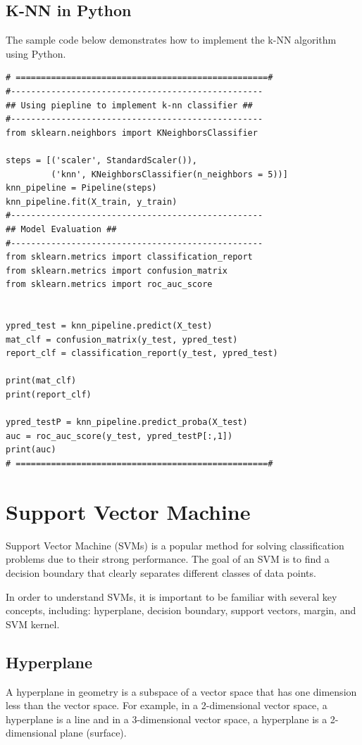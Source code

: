\subsection{K-NN in Python}

The sample code below demonstrates how to implement the k-NN algorithm using Python.

\begin{lstlisting}
# ==================================================#
#--------------------------------------------------
## Using piepline to implement k-nn classifier ##
#--------------------------------------------------
from sklearn.neighbors import KNeighborsClassifier

steps = [('scaler', StandardScaler()),
         ('knn', KNeighborsClassifier(n_neighbors = 5))]
knn_pipeline = Pipeline(steps)
knn_pipeline.fit(X_train, y_train)
#--------------------------------------------------
## Model Evaluation ##
#--------------------------------------------------
from sklearn.metrics import classification_report
from sklearn.metrics import confusion_matrix
from sklearn.metrics import roc_auc_score


ypred_test = knn_pipeline.predict(X_test)
mat_clf = confusion_matrix(y_test, ypred_test)
report_clf = classification_report(y_test, ypred_test)

print(mat_clf)
print(report_clf)

ypred_testP = knn_pipeline.predict_proba(X_test)
auc = roc_auc_score(y_test, ypred_testP[:,1])
print(auc)
# ==================================================#
\end{lstlisting}

\newpage
\section{Support Vector Machine}
Support Vector Machine (SVMs) is a popular method for solving classification problems due to their strong performance. The goal of an SVM is to find a decision boundary that clearly separates different classes of data points.

In order to understand SVMs, it is important to be familiar with several key concepts, including: hyperplane, decision boundary, support vectors, margin, and SVM kernel.

\subsection{Hyperplane}
A hyperplane in geometry is a subspace of a vector space that has one dimension less than the vector space. For example, in a 2-dimensional vector space, a hyperplane is a line and in a 3-dimensional vector space, a hyperplane is a 2-dimensional plane (surface).

